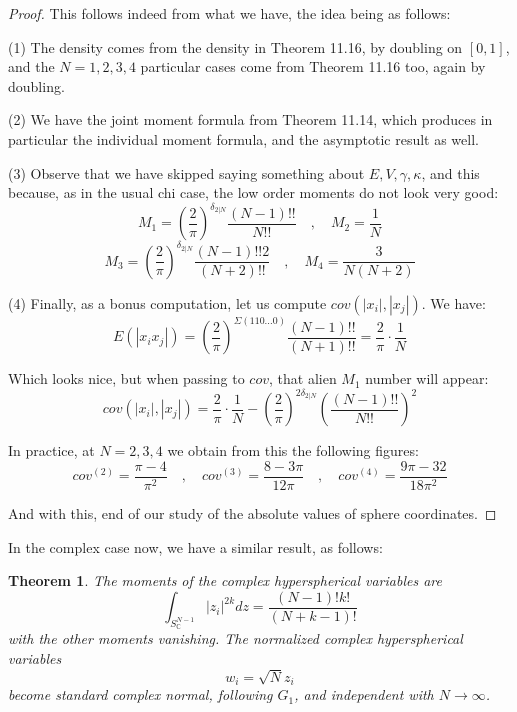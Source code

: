 \documentclass[12pt]{amsbook}
\newtheorem{theorem}{Theorem}[chapter]
\begin{document}
\begin{proof}
This follows indeed from what we have, the idea being as follows:

\medskip

(1) The density comes from the density in Theorem 11.16, by doubling on $[0,1]$, and the $N=1,2,3,4$ particular cases come from Theorem 11.16 too, again by doubling.

\medskip

(2) We have the joint moment formula from Theorem 11.14, which produces in particular the individual moment formula, and the asymptotic result as well.

\medskip

(3) Observe that we have skipped saying something about $E,V,\gamma,\kappa$, and this because, as in the usual chi case, the low order moments do not look very good:
$$M_1=\left(\frac{2}{\pi}\right)^{\delta_{2|N}}\frac{(N-1)!!}{N!!}\quad,\quad M_2=\frac{1}{N}$$
$$M_3=\left(\frac{2}{\pi}\right)^{\delta_{2|N}}\frac{(N-1)!!2}{(N+2)!!}\quad,\quad M_4=\frac{3}{N(N+2)}$$

(4) Finally, as a bonus computation, let us compute $cov(|x_i|,|x_j|)$. We have:
$$E(|x_ix_j|)=\left(\frac{2}{\pi}\right)^{\Sigma(110\ldots0)}\frac{(N-1)!!}{(N+1)!!}=\frac{2}{\pi}\cdot\frac{1}{N}$$

Which looks nice, but when passing to $cov$, that alien $M_1$ number will appear:
$$cov(|x_i|,|x_j|)=\frac{2}{\pi}\cdot\frac{1}{N}-\left(\frac{2}{\pi}\right)^{2\delta_{2|N}}\left(\frac{(N-1)!!}{N!!}\right)^2$$

In practice, at $N=2,3,4$ we obtain from this the following figures:
$$cov^{(2)}=\frac{\pi-4}{\pi^2}\quad,\quad cov^{(3)}=\frac{8-3\pi}{12\pi}
\quad,\quad cov^{(4)}=\frac{9\pi-32}{18\pi^2}$$

And with this, end of our study of the absolute values of sphere coordinates.
\end{proof}

In the complex case now, we have a similar result, as follows:

\begin{theorem}
The moments of the complex hyperspherical variables are
$$\int_{S^{N-1}_\mathbb C}|z_i|^{2k}dz=\frac{(N-1)!k!}{(N+k-1)!}$$
with the other moments vanishing. The normalized complex hyperspherical variables 
$$w_i=\sqrt{N}z_i$$
become standard complex normal, following $G_1$, and independent with $N\to\infty$.
\end{theorem}
\end{document}
